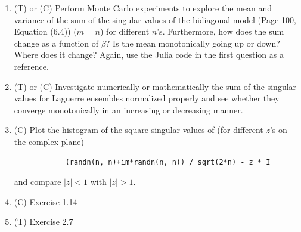 \documentclass{article}
\begin{document}
\begin{enumerate}
    \item (T) or (C) Perform Monte Carlo experiments to explore the mean and variance of the sum of the singular values of the bidiagonal model (Page 100, Equation (6.4)) ($m = n$) for different $n$'s. Furthermore, how does the sum change as a function of $\beta$? Is the mean monotonically going up or down? Where does it change? Again, use the Julia code in the first question as a reference.
    \item (T) or (C) Investigate numerically or mathematically the sum of the singular values for Laguerre ensembles normalized properly and see whether they converge monotonically in an increasing or decreasing manner.
    \item (C) Plot the histogram of the square singular values of (for different $z$'s on the complex plane)
        \begin{verbatim}
            (randn(n, n)+im*randn(n, n)) / sqrt(2*n) - z * I
        \end{verbatim} and compare $|z|<1$ with $|z|>1$.
    \item (C) Exercise 1.14
    \item (T) Exercise 2.7
\end{enumerate}
 
\end{document}
